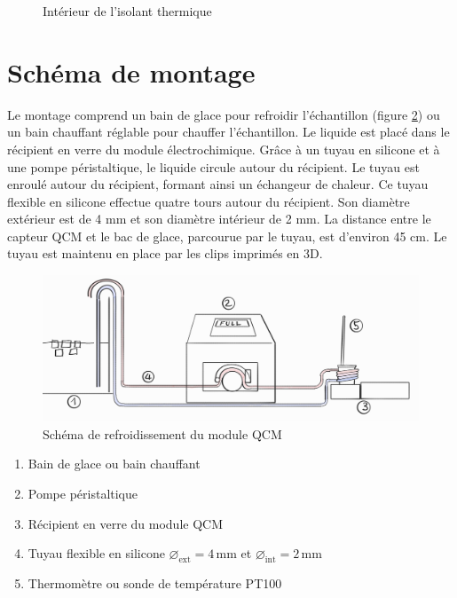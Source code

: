 \begin{figure}[H]
\begin{minipage}{0.48\textwidth}
        \caption{Intérieur de l'isolant thermique}
        \label{fig:Interieur_Isolant}
    \end{minipage}
\end{figure}
\newpage
\section{Schéma de montage}

Le montage comprend un bain de glace pour refroidir  l’échantillon (figure \ref{fig:Shema_glacière}) ou un bain chauffant réglable pour chauffer l’échantillon.
Le liquide est placé dans le récipient en verre du module électrochimique.
Grâce à un tuyau en silicone et à une pompe péristaltique, le liquide circule autour du récipient.
Le tuyau est enroulé autour du récipient, formant ainsi un échangeur de chaleur.
Ce tuyau flexible en silicone effectue quatre tours autour du récipient. Son diamètre extérieur est de 4 mm et son diamètre intérieur de 2 mm. La distance entre le capteur QCM et le bac de glace, parcourue par le tuyau, est d’environ 45 cm.
Le tuyau est maintenu en place par les clips imprimés en 3D.

\begin{figure}[H]
    \centering
    \includegraphics[width=\textwidth]{assets/figures/Pump TB.png}
    \caption{Schéma de refroidissement du module QCM}
    \label{fig:Shema_glacière}
\end{figure}

\begin{enumerate}
    \item Bain de glace ou bain chauffant
    \item Pompe péristaltique
    \item Récipient en verre du module QCM
    \item Tuyau flexible en silicone  $\varnothing_\text{ext} = 4\,\mathrm{mm}$ et $\varnothing_\text{int} = 2\,\mathrm{mm}$
    \item Thermomètre ou sonde de température PT100
\end{enumerate}

